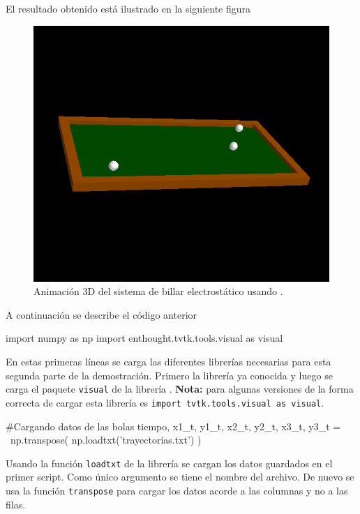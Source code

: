 El resultado obtenido está ilustrado en la siguiente figura


\begin{figure}[htbp]
	\centering
	\includegraphics[width=0.75
	\textwidth]
	{./pictures/billiards_animated.png}

	\caption{\small{Animación 3D del sistema de billar electrostático 
	usando \mayavi.}}
	
	\label{fig:balls_trayectories_3D}
\end{figure}


A continuación se describe el código anterior


\begin{listing}[style=python, numbers = none]
import numpy as np
import enthought.tvtk.tools.visual as visual
\end{listing}
En estas primeras líneas se carga las diferentes librerías necesarias para
esta segunda parte de la demostración. Primero la librería \numpy ya 
conocida y luego se carga el paquete \texttt{visual} de la librería \mayavi.
\textbf{Nota:} para algunas versiones de \mayavi la forma correcta de 
cargar esta librería es \texttt{import tvtk.tools.visual as visual}.


\begin{listing}[style=python, numbers = none]
#Cargando datos de las bolas
tiempo, x1_t, y1_t, x2_t, y2_t, x3_t, y3_t = \
np.transpose( np.loadtxt('trayectorias.txt') )
\end{listing}
Usando la función \texttt{loadtxt} de la librería \numpy se cargan los 
datos guardados en el primer script. Como único argumento se tiene el 
nombre del archivo. De nuevo se usa la función \texttt{transpose} para 
cargar los datos acorde a las columnas y no a las filas.


